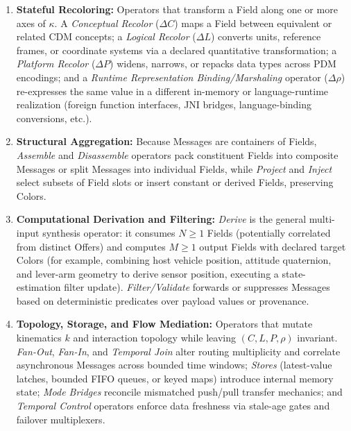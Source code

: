 \begin{enumerate}[topsep=2pt, itemsep=1pt, leftmargin=1.8em]
    \item \textbf{Stateful Recoloring:} Operators that transform a Field along one or more axes of $\kappa$.  A \emph{Conceptual Recolor} ($\Delta C$) maps a Field between equivalent or related CDM concepts; a \emph{Logical Recolor} ($\Delta L$) converts units, reference frames, or coordinate systems via a declared quantitative transformation; a \emph{Platform Recolor} ($\Delta P$) widens, narrows, or repacks data types across PDM encodings; and a \emph{Runtime Representation Binding/Marshaling} operator ($\Delta\rho$) re-expresses the same value in a different in-memory or language-runtime realization (foreign function interfaces, JNI bridges, language-binding conversions, etc.).
    \item \textbf{Structural Aggregation:} Because Messages are containers of Fields, \emph{Assemble} and \emph{Disassemble} operators pack constituent Fields into composite Messages or split Messages into individual Fields, while \emph{Project} and \emph{Inject} select subsets of Field slots or insert constant or derived Fields, preserving Colors.
    \item \textbf{Computational Derivation and Filtering:} \emph{Derive} is the general multi-input synthesis operator: it consumes $N \ge 1$ Fields (potentially correlated from distinct Offers) and computes $M \ge 1$ output Fields with declared target Colors (for example, combining host vehicle position, attitude quaternion, and lever-arm geometry to derive sensor position, executing a state-estimation filter update).  \emph{Filter/Validate} forwards or suppresses Messages based on deterministic predicates over payload values or provenance.
    \item \textbf{Topology, Storage, and Flow Mediation:} Operators that mutate kinematics $k$ and interaction topology while leaving $(C, L, P, \rho)$ invariant.  \emph{Fan-Out}, \emph{Fan-In}, and \emph{Temporal Join} alter routing multiplicity and correlate asynchronous Messages across bounded time windows; \emph{Stores} (latest-value latches, bounded FIFO queues, or keyed maps) introduce internal memory state; \emph{Mode Bridges} reconcile mismatched push/pull transfer mechanics; and \emph{Temporal Control} operators enforce data freshness via stale-age gates and failover multiplexers.
\end{enumerate}

